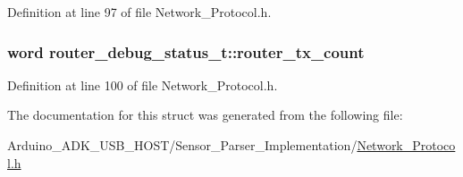 Definition at line 97 of file Network\-\_\-\-Protocol.\-h.

\hypertarget{structrouter__debug__status__t_a4072b48ecc482dfd9f9116d9eed25c73}{
\subsubsection[{router\-\_\-tx\-\_\-count}]{\setlength{\rightskip}{0pt plus 5cm}word router\-\_\-debug\-\_\-status\-\_\-t\-::router\-\_\-tx\-\_\-count}}\label{structrouter__debug__status__t_a4072b48ecc482dfd9f9116d9eed25c73}


Definition at line 100 of file Network\-\_\-\-Protocol.\-h.



The documentation for this struct was generated from the following file\-:\begin{DoxyCompactItemize}
\item 
Arduino\-\_\-\-A\-D\-K\-\_\-\-U\-S\-B\-\_\-\-H\-O\-S\-T/\-Sensor\-\_\-\-Parser\-\_\-\-Implementation/\hyperlink{_network___protocol_8h}{Network\-\_\-\-Protocol.\-h}\end{DoxyCompactItemize}
